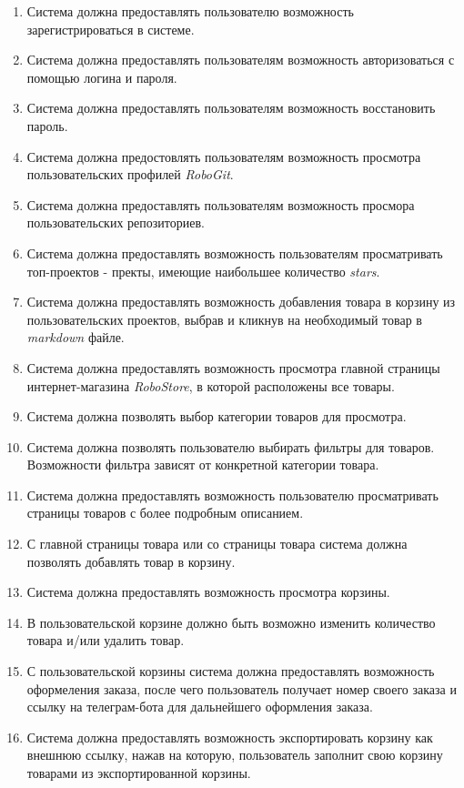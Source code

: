 \documentclass[12pt, a4paper]{article}
\begin{document}
\begin{enumerate}
\item Система должна предоставлять пользователю возможность
  зарегистрироваться в системе.
\item Система должна предоставлять пользователям возможность
  авторизоваться с помощью логина и пароля.
\item Система должна предоставлять пользователям возможность
  восстановить пароль.
\item Система должна предостовлять пользователям возможность
  просмотра пользовательских профилей \textit{RoboGit}.
\item Система должна предоставлять пользователям возможность 
  просмора пользовательских репозиториев.
\item Система должна предоставлять возможность пользователям 
  просматривать топ-проектов - пректы, имеющие наибольшее 
  количество \textit{stars}.
\item Система должна предоставлять возможность добавления товара 
  в корзину из пользовательских проектов, выбрав и кликнув на 
    необходимый товар в \textit{markdown} файле.
\item Система должна предоставлять возможность просмотра главной 
  страницы интернет-магазина \textit{RoboStore}, в которой расположены 
  все товары.
\item Система должна позволять выбор категории товаров для просмотра.
\item Система должна позволять пользователю выбирать фильтры для 
  товаров. Возможности фильтра зависят от конкретной категории товара.
\item Система должна предоставлять возможность пользователю 
  просматривать страницы товаров с более подробным описанием.
\item С главной страницы товара или со страницы товара система 
  должна позволять добавлять товар в корзину.
\item Система должна предоставлять возможность просмотра корзины.
\item В пользовательской корзине должно быть возможно изменить 
  количество товара и/или удалить товар.
\item С пользовательской корзины система должна предоставлять 
  возможность оформеления заказа, после чего пользователь получает 
  номер своего заказа и ссылку на телеграм-бота для дальнейшего 
  оформления заказа.
\item Система должна предоставлять возможность экспортировать 
  корзину как внешнюю ссылку, нажав на которую, пользователь 
  заполнит свою корзину товарами из экспортированной корзины.
\end{enumerate}
\end{document}
